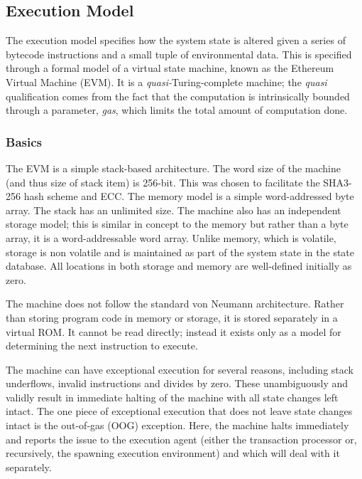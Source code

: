 \documentclass[9pt,oneside]{amsart}
\begin{document}
\begin{multicols}{2}
\subsection{Execution Model} \label{ch:model}

The execution model specifies how the system state is altered given a series of bytecode instructions and a small tuple of environmental data. This is specified through a formal model of a virtual state machine, known as the Ethereum Virtual Machine (EVM). It is a \textit{quasi-}Turing-complete machine; the \textit{quasi} qualification comes from the fact that the computation is intrinsically bounded through a parameter, \textit{gas}, which limits the total amount of computation done.

\subsubsection{Basics}

The EVM is a simple stack-based architecture. The word size of the machine (and thus size of stack item) is 256-bit. This was chosen to facilitate the SHA3-256 hash scheme and ECC. The memory model is a simple word-addressed byte array. The stack has an unlimited size. The machine also has an independent storage model; this is similar in concept to the memory but rather than a byte array, it is a word-addressable word array. Unlike memory, which is volatile, storage is non volatile and is maintained as part of the system state in the state database. All locations in both storage and memory are well-defined initially as zero.

The machine does not follow the standard von Neumann architecture. Rather than storing program code in memory or storage, it is stored separately in a virtual ROM. It cannot be read directly; instead it exists only as a model for determining the next instruction to execute.

The machine can have exceptional execution for several reasons, including stack underflows, invalid instructions and divides by zero. These unambiguously and validly result in immediate halting of the machine with all state changes left intact. The one piece of exceptional execution that does not leave state changes intact is the out-of-gas (OOG) exception. Here, the machine halts immediately and reports the issue to the execution agent (either the transaction processor or, recursively, the spawning execution environment) and which will deal with it separately.


\end{multicols}
\end{document}
